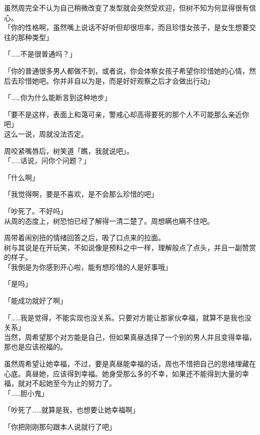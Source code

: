 虽然周完全不认为自己稍微改变了发型就会突然受欢迎，但树不知为何显得很有信心。\\

「你的性格啊，虽然嘴上说话不好听但却很坦率，而且珍惜女孩子，是女生想要交往的那种类型」

「……不是很普通吗？」

「你的普通很多男人都做不到，或者说，你会体察女孩子希望你珍惜她的心情，然后去珍惜她吧。你并非自以为是，而是好好观察之后才会做出行动」

「……你为什么能断言到这种地步」

「要不是这样，表面上和蔼可亲，警戒心却高得要死的那个人不可能那么亲近你吧」\\

这么一说，周就没法否定。

周咬紧嘴唇后，树笑道「瞧，我就说吧」。\\

「……话说，问你个问题？」

「什么啊」

「我觉得啊，要是不喜欢，是不会那么珍惜的吧」

「吵死了。不好吗」\\

从周的态度上，树恐怕已经了解得一清二楚了。周想瞒也瞒不住吧。

周带着闹别扭的情绪回答之后，吸了口点来的拉面。\\

树与其说是在开玩笑，不如说像是预料之中一样，理解般点了点头，并且一副赞赏的样子。\\

「我倒是为你感到开心啦，能有想珍惜的人是好事哦」

「是吗」

「能成功就好了啊」

「……我是觉得，不能实现也没关系。只要对方能让那家伙幸福，就算不是我也没关系」\\

当然，周希望那个对方能是自己，但如果真昼选择了一个别的男人并且变得幸福，那也是应该祝福的。

虽然周希望让她幸福，不过，要是真昼能幸福的话，周也不惜把自己的思绪埋藏在心底。真昼她，应该得到幸福。她身受那么多的不幸，如果还不能得到大量的幸福，就对不起她至今为止的努力了。\\

「……胆小鬼」

「吵死了……就算是我，也想要让她幸福啊」

「你把刚刚那句跟本人说就行了吧」

